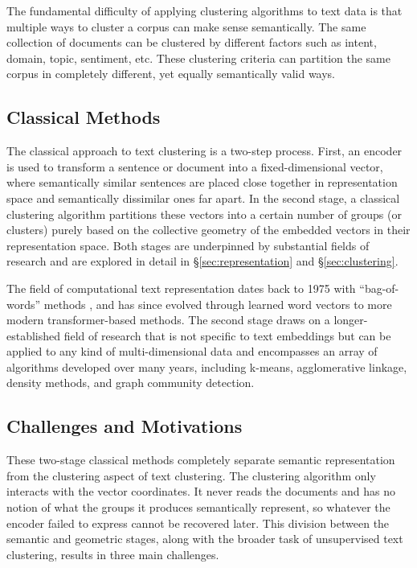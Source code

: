 \documentclass[11pt,a4paper,oneside]{report}
\begin{document}
The fundamental difficulty of applying clustering algorithms to text data is that multiple ways to cluster a corpus can make sense semantically. The same collection of documents can be clustered by different factors such as intent, domain, topic,  sentiment, etc. These clustering criteria can partition the same corpus in completely different, yet equally semantically valid ways.

\subsection{Classical Methods}

The classical approach to text clustering is a two-step process. First, an encoder is used to transform a sentence or document into a fixed-dimensional vector, where  semantically similar sentences are placed close together in representation space and semantically dissimilar ones far apart. In the second stage, a classical clustering algorithm partitions these vectors into a certain number of groups (or clusters) purely based on the collective geometry of the embedded vectors in their representation space. Both stages are underpinned by substantial fields of research and are explored in detail in \S\ref{sec:representation} and \S\ref{sec:clustering}.

The field of computational text representation dates back to 1975 with ``bag-of-words'' methods \citep{salton1975vector}, and has since evolved through learned word vectors to more modern transformer-based methods. The second stage draws on a longer-established field of research that is not specific to text embeddings but can be applied to any kind of multi-dimensional data and encompasses an array of algorithms developed over many years, including k-means, agglomerative linkage, density methods, and graph community detection.

\subsection{Challenges and Motivations}

These two-stage classical methods completely separate semantic representation from the clustering aspect of text clustering. The clustering algorithm only interacts with the vector coordinates. It never reads the documents and has no notion of what the groups it produces semantically represent, so whatever the encoder failed to express cannot be recovered later. This division between the semantic and geometric stages, along with the broader task of unsupervised text clustering, results in three main challenges.
\end{document}
